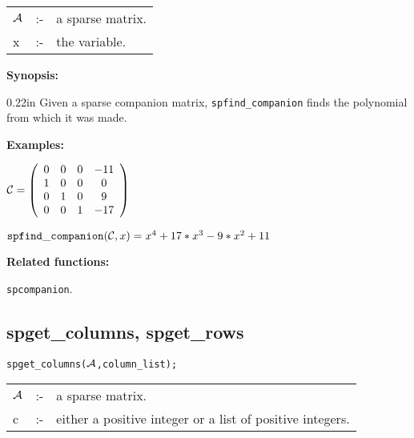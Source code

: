\hspace*{0.1in} 
\begin{tabular}{l l l}
${\cal A}$ &:-& a sparse matrix. \\
x          &:-& the variable.
\end{tabular}

{\bf Synopsis:} 

\begin{addtolength}{\leftskip}{0.22in}
  Given a sparse companion matrix, {\tt spfind\_companion} finds the polynomial 
from which it was made.

\end{addtolength}


{\bf Examples:}

\begin{flushleft}
\hspace*{0.175in}
\begin{math}  
{\cal C} = \left( \begin{array}{cccc} 0 & 0 & 0 & -11 \\ 1 & 0 & 0 & 0 
\\ 0 & 1 & 0 & 9 \\ 0 & 0 & 1 & -17 
\end{array} \right)
\end{math}  
\end{flushleft}

\vspace*{3mm}

\begin{flushleft}
\hspace*{0.175in}
\begin{math}  
{\tt spfind\_companion}({\cal C},x) = x^4+17*x^3-9*x^2+11
\end{math}  
\end{flushleft}

\vspace*{3mm}

{\bf Related functions:}

\hspace*{0.175in} {\tt spcompanion}.

\subsection{spget\_columns, spget\_rows}

\hspace*{0.175in} {\tt spget\_columns(${\cal A}$,column\_list);}

\hspace*{0.1in} 
\begin{tabular}{l l l}
${\cal A}$ &:-& a sparse matrix. \\
c          &:-& either a positive integer or a list of positive 
                integers.
\end{tabular}

